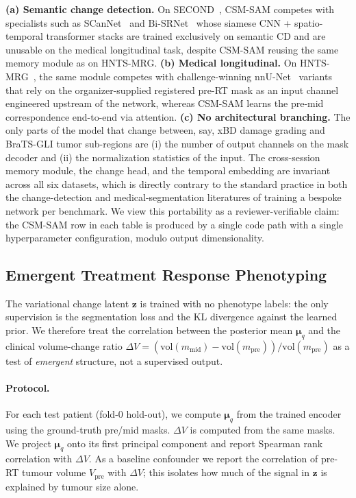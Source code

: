 \textbf{(a) Semantic change detection.} On SECOND~\cite{yang2021second},
CSM-SAM competes with specialists such as
SCanNet~\cite{ding2024scannet} and Bi-SRNet~\cite{ding2022bisrnet}
whose siamese CNN + spatio-temporal transformer stacks are trained
exclusively on semantic CD and are unusable on the medical
longitudinal task, despite CSM-SAM reusing the same memory module
as on HNTS-MRG. \textbf{(b) Medical longitudinal.} On
HNTS-MRG~\cite{wahid2024hntsmrg}, the same module competes with
challenge-winning nnU-Net~\cite{isensee2021nnunet} variants that rely
on the organizer-supplied registered pre-RT mask as an input channel
engineered upstream of the network, whereas CSM-SAM learns the
pre-mid correspondence end-to-end via attention. \textbf{(c) No
architectural branching.} The only parts of the model that change
between, say, xBD damage grading and BraTS-GLI tumor sub-regions are
(i) the number of output channels on the mask decoder and (ii) the
normalization statistics of the input. The cross-session memory
module, the change head, and the temporal embedding are invariant
across all six datasets, which is directly contrary to the standard
practice in both the change-detection and medical-segmentation
literatures of training a bespoke network per benchmark. We view this
portability as a reviewer-verifiable claim: the CSM-SAM row in each
table is produced by a single code path with a single hyperparameter
configuration, modulo output dimensionality.

\subsection{Emergent Treatment Response Phenotyping}
\label{sec:results:phenotype}

The variational change latent $\mathbf{z}$ is trained with no phenotype
labels: the only supervision is the segmentation loss and the KL divergence
against the learned prior.  We therefore treat the correlation between the
posterior mean $\boldsymbol{\mu}_q$ and the clinical volume-change ratio
$\Delta V = (\mathrm{vol}(m_{\text{mid}}) - \mathrm{vol}(m_{\text{pre}})) /
\mathrm{vol}(m_{\text{pre}})$ as a test of \emph{emergent} structure, not a
supervised output.

\paragraph{Protocol.}
For each test patient (fold-0 hold-out), we compute $\boldsymbol{\mu}_q$
from the trained encoder using the ground-truth pre/mid masks.  $\Delta V$ is
computed from the same masks.  We project $\boldsymbol{\mu}_q$ onto its
first principal component and report Spearman rank correlation with $\Delta V$.
As a baseline confounder we report the correlation of pre-RT tumour volume
$V_{\text{pre}}$ with $\Delta V$; this isolates how much of the signal in
$\mathbf{z}$ is explained by tumour size alone.

